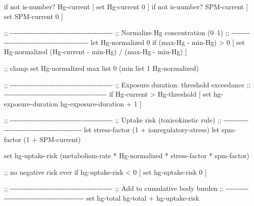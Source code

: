 \documentclass[
]{book}
\newenvironment{Shaded}{\begin{snugshade}}{\end{snugshade}}
\newcommand{\NormalTok}[1]{#1}
\begin{document}
\begin{Shaded}
\begin{Highlighting}[]
\NormalTok{  if not is{-}number? Hg{-}current [ set Hg{-}current 0 ]}
\NormalTok{  if not is{-}number? SPM{-}current [ set SPM{-}current 0 ]}

\NormalTok{  ;; {-}{-}{-}{-}{-}{-}{-}{-}{-}{-}{-}{-}{-}{-}{-}{-}{-}{-}{-}{-}{-}{-}{-}{-}{-}{-}{-}{-}{-}{-}{-}{-}{-}{-}{-}{-}{-}{-}{-}{-}{-}{-}{-}{-}{-}}
\NormalTok{  ;; Normalize Hg concentration (0–1)}
\NormalTok{  ;; {-}{-}{-}{-}{-}{-}{-}{-}{-}{-}{-}{-}{-}{-}{-}{-}{-}{-}{-}{-}{-}{-}{-}{-}{-}{-}{-}{-}{-}{-}{-}{-}{-}{-}{-}{-}{-}{-}{-}{-}{-}{-}{-}{-}{-}}
\NormalTok{  let Hg{-}normalized 0}
\NormalTok{  if (max{-}Hg {-} min{-}Hg) \textgreater{} 0 [}
\NormalTok{    set Hg{-}normalized (Hg{-}current {-} min{-}Hg) / (max{-}Hg {-} min{-}Hg)}
\NormalTok{  ]}
  
\NormalTok{  ;; clamp}
\NormalTok{  set Hg{-}normalized max list 0 (min list 1 Hg{-}normalized)}
  
\NormalTok{  ;; {-}{-}{-}{-}{-}{-}{-}{-}{-}{-}{-}{-}{-}{-}{-}{-}{-}{-}{-}{-}{-}{-}{-}{-}{-}{-}{-}{-}{-}{-}{-}{-}{-}{-}{-}{-}{-}{-}{-}{-}{-}{-}{-}{-}{-}}
\NormalTok{  ;; Exposure duration: threshold exceedance}
\NormalTok{  ;; {-}{-}{-}{-}{-}{-}{-}{-}{-}{-}{-}{-}{-}{-}{-}{-}{-}{-}{-}{-}{-}{-}{-}{-}{-}{-}{-}{-}{-}{-}{-}{-}{-}{-}{-}{-}{-}{-}{-}{-}{-}{-}{-}{-}{-}}
\NormalTok{  if Hg{-}current \textgreater{} Hg{-}threshold [}
\NormalTok{    set hg{-}exposure{-}duration hg{-}exposure{-}duration + 1}
\NormalTok{  ]}
  
\NormalTok{  ;; {-}{-}{-}{-}{-}{-}{-}{-}{-}{-}{-}{-}{-}{-}{-}{-}{-}{-}{-}{-}{-}{-}{-}{-}{-}{-}{-}{-}{-}{-}{-}{-}{-}{-}{-}{-}{-}{-}{-}{-}{-}{-}{-}{-}{-}}
\NormalTok{  ;; Uptake risk (toxicokinetic rule)}
\NormalTok{  ;; {-}{-}{-}{-}{-}{-}{-}{-}{-}{-}{-}{-}{-}{-}{-}{-}{-}{-}{-}{-}{-}{-}{-}{-}{-}{-}{-}{-}{-}{-}{-}{-}{-}{-}{-}{-}{-}{-}{-}{-}{-}{-}{-}{-}{-}}
\NormalTok{  let stress{-}factor (1 + ionregulatory{-}stress)}
\NormalTok{  let spm{-}factor    (1 + SPM{-}current)}

\NormalTok{  set hg{-}uptake{-}risk (metabolism{-}rate * Hg{-}normalized * stress{-}factor * spm{-}factor)}

\NormalTok{  ;; no negative risk ever}
\NormalTok{  if hg{-}uptake{-}risk \textless{} 0 [ set hg{-}uptake{-}risk 0 ]}

\NormalTok{  ;; {-}{-}{-}{-}{-}{-}{-}{-}{-}{-}{-}{-}{-}{-}{-}{-}{-}{-}{-}{-}{-}{-}{-}{-}{-}{-}{-}{-}{-}{-}{-}{-}{-}{-}{-}{-}{-}{-}{-}{-}{-}{-}{-}{-}{-}}
\NormalTok{  ;; Add to cumulative body burden}
\NormalTok{  ;; {-}{-}{-}{-}{-}{-}{-}{-}{-}{-}{-}{-}{-}{-}{-}{-}{-}{-}{-}{-}{-}{-}{-}{-}{-}{-}{-}{-}{-}{-}{-}{-}{-}{-}{-}{-}{-}{-}{-}{-}{-}{-}{-}{-}{-}}
\NormalTok{  set hg{-}total hg{-}total + hg{-}uptake{-}risk}
  

\end{Highlighting}
\end{Shaded}
\end{document}
